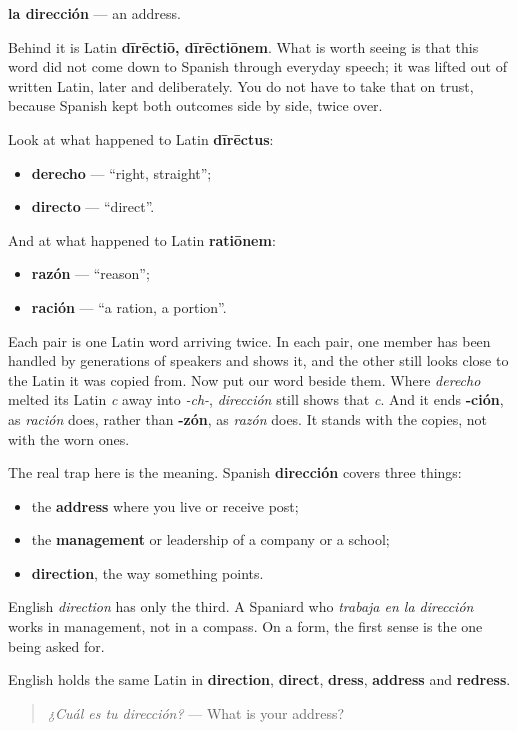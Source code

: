 \begin{cousinweb}
\textbf{la dirección} — an address.

Behind it is Latin \textbf{dīrēctiō, dīrēctiōnem}. What is worth seeing is that this word did not come down to Spanish through everyday speech; it was lifted out of written Latin, later and deliberately. You do not have to take that on trust, because Spanish kept both outcomes side by side, twice over.

Look at what happened to Latin \textbf{dīrēctus}:

\begin{itemize}
\raggedright
  \item \textbf{derecho} — \textquotedblleft{}right, straight\textquotedblright{};
  \item \textbf{directo} — \textquotedblleft{}direct\textquotedblright{}.
\end{itemize}

And at what happened to Latin \textbf{ratiōnem}:

\begin{itemize}
\raggedright
  \item \textbf{razón} — \textquotedblleft{}reason\textquotedblright{};
  \item \textbf{ración} — \textquotedblleft{}a ration, a portion\textquotedblright{}.
\end{itemize}

Each pair is one Latin word arriving twice. In each pair, one member has been handled by generations of speakers and shows it, and the other still looks close to the Latin it was copied from. Now put our word beside them. Where \emph{derecho} melted its Latin \emph{c} away into \emph{-ch-}, \emph{dirección} still shows that \emph{c}. And it ends \textbf{-ción}, as \emph{ración} does, rather than \textbf{-zón}, as \emph{razón} does. It stands with the copies, not with the worn ones.

The real trap here is the meaning. Spanish \textbf{dirección} covers three things:

\begin{itemize}
\raggedright
  \item the \textbf{address} where you live or receive post;
  \item the \textbf{management} or leadership of a company or a school;
  \item \textbf{direction}, the way something points.
\end{itemize}

English \emph{direction} has only the third. A Spaniard who \emph{trabaja en la dirección} works in management, not in a compass. On a form, the first sense is the one being asked for.

English holds the same Latin in \textbf{direction}, \textbf{direct}, \textbf{dress}, \textbf{address} and \textbf{redress}.

\begin{quote}
\emph{¿Cuál es tu dirección?} — What is your address?
\end{quote}
\end{cousinweb}

